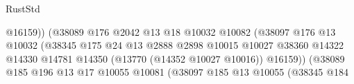 \begin{lexlean}{RustStd}
\begin{coremodule}
                                                          @16159))
                                                      (@38089
                                                        @176
                                                        @2042
                                                        @13
                                                        @18
                                                        @10032
                                                        @10082
                                                        (@38097
                                                          @176
                                                          @13
                                                          @10032
                                                          (@38345
                                                            @175
                                                            @24
                                                            @13
                                                            @2888
                                                            @2898
                                                            @10015
                                                            @10027
                                                            @38360
                                                            @14322
                                                            @14330
                                                            @14781
                                                            @14350
                                                            (@13770 (@14352 @10027 @10016))
                                                            @16159))
                                                        (@38089
                                                          @185
                                                          @196
                                                          @13
                                                          @17
                                                          @10055
                                                          @10081
                                                          (@38097
                                                            @185
                                                            @13
                                                            @10055
                                                            (@38345
                                                              @184

\end{coremodule}
\end{lexlean}
